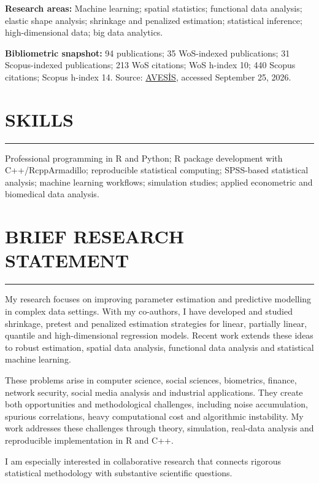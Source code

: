\documentclass[10pt,letterpaper]{article}
\newlength{\spacebox}
\newcommand{\sepspace}{\vspace*{0.65em}}		%
\newcommand{\NewPart}[2]{%
	\Needspace{7\baselineskip}%
	\vspace{0.45em}%
	\section*{\sffamily\large\bfseries\color{MidnightBlue}\uppercase{#1} #2}%
	\vspace{-0.7em}\noindent\color{MidnightBlue}\rule{\textwidth}{0.55pt}\color{Black}\vspace{0.25em}}
\newcommand{\PersonalEntry}[2]{
		\noindent\hangindent=2em\hangafter=0 %
		\parbox{\spacebox}{        %
		\textit{#1}}		       %
		\hspace{1.5em} #2 \par}    %
\begin{document}
\sepspace
\noindent\textbf{Research areas:} Machine learning; spatial statistics; functional data analysis; elastic shape analysis; shrinkage and penalized estimation; statistical inference; high-dimensional data; big data analytics.

\sepspace
\noindent\textbf{Bibliometric snapshot:} 94 publications; 35 WoS-indexed publications; 31 Scopus-indexed publications; 213 WoS citations; WoS h-index 10; 440 Scopus citations; Scopus h-index 14. Source: \href{https://avesis.inonu.edu.tr/bahadir.yuzbasi}{AVES\.{I}S}, accessed September 25, 2026.

 \NewPart{Skills}{}
Professional programming in R and Python; R package development with C++/RcppArmadillo; reproducible statistical computing; SPSS-based statistical analysis; machine learning workflows; simulation studies; applied econometric and biomedical data analysis.




 \NewPart{Brief Research Statement}{}
My research focuses on improving parameter estimation and predictive modelling in complex data settings. With my co-authors, I have developed and studied shrinkage, pretest and penalized estimation strategies for linear, partially linear, quantile and high-dimensional regression models. Recent work extends these ideas to robust estimation, spatial data analysis, functional data analysis and statistical machine learning.

These problems arise in computer science, social sciences, biometrics, finance, network security, social media analysis and industrial applications. They create both opportunities and methodological challenges, including noise accumulation, spurious correlations, heavy computational cost and algorithmic instability. My work addresses these challenges through theory, simulation, real-data analysis and reproducible implementation in R and C++.

I am especially interested in collaborative research that connects rigorous statistical methodology with substantive scientific questions.



\end{document}
